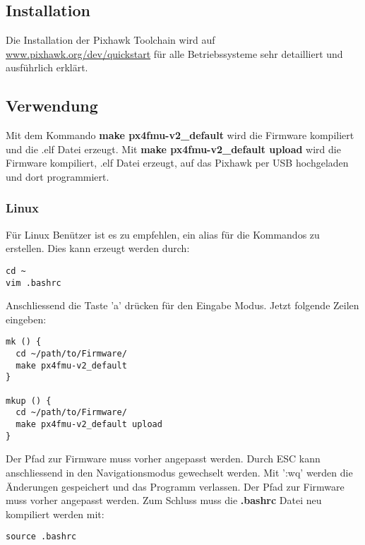 \subsection{Installation}
\begin{flushleft}

Die Installation der Pixhawk Toolchain wird auf \href{https://pixhawk.org/dev/quickstart}{www.pixhawk.org/dev/quickstart} für alle Betriebssysteme sehr detailliert und ausführlich erklärt.

\end{flushleft}



\subsection{Verwendung}
\noindent
Mit dem Kommando \textbf{make px4fmu-v2\_default} wird die Firmware kompiliert und die .elf Datei erzeugt. Mit \textbf{make px4fmu-v2\_default upload} wird die Firmware kompiliert, .elf Datei erzeugt, auf das Pixhawk per USB hochgeladen und dort programmiert.

\subsubsection{Linux}

Für Linux Benützer ist es zu empfehlen, ein alias für die Kommandos zu erstellen. Dies kann erzeugt werden durch:
\begin{lstlisting}
cd ~
vim .bashrc
\end{lstlisting}

\noindent
Anschliessend die Taste 'a' drücken für den Eingabe Modus. Jetzt folgende Zeilen eingeben:

\begin{lstlisting}
mk () {
  cd ~/path/to/Firmware/
  make px4fmu-v2_default
}

mkup () {
  cd ~/path/to/Firmware/
  make px4fmu-v2_default upload
}
\end{lstlisting}

\noindent
Der Pfad zur Firmware muss vorher angepasst werden. Durch ESC kann anschliessend in den Navigationsmodus gewechselt werden. Mit ':wq' werden die Änderungen gespeichert und das Programm verlassen. Der Pfad zur Firmware muss vorher angepasst werden. Zum Schluss muss die  \textbf{.bashrc} Datei neu kompiliert werden mit:

\begin{lstlisting}
source .bashrc
\end{lstlisting}

